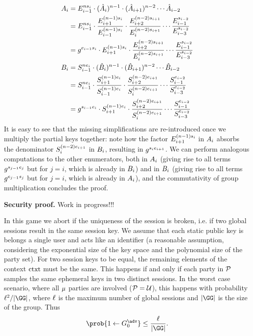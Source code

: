 \begin{align*}
	A_{i} &= E_{i-1}^{ns_i} \cdot (\hat{A}_{i})^{n-1} \cdot (\hat{A}_{i+1})^{n-2} \cdots \hat{A}_{i-2} \\
	&= E_{i-1}^{ns_i} \cdot  \dfrac{E_{i+1}^{(n-1)s_i}}{E_{i-1}^{(n-1)s_i}} \cdot \dfrac{E_{i+2}^{(n-2)s_{i+1}}}{E_{i}^{(n-2)s_{i+1}}} \cdots  \dfrac{E_{i-1}^{s_{i-2}}}{E_{i-3}^{s_{i-2}}}  \\
	&= g^{e_{i-1}s_i} \cdot E_{i+1}^{(n-1)s_i} \cdot \dfrac{E_{i+2}^{(n-2)s_{i+1}}}{E_{i}^{(n-2)s_{i+1}}} \cdots  \dfrac{E_{i-1}^{s_{i-2}}}{E_{i-3}^{s_{i-2}}}  \\
	B_{i} &= S_{i-1}^{ne_i} \cdot (\hat{B}_{i})^{n-1} \cdot (\hat{B}_{i+1})^{n-2} \cdots \hat{B}_{i-2}  \\
	&= S_{i-1}^{ne_i} \cdot  \dfrac{S_{i+1}^{(n-1)e_i}}{S_{i-1}^{(n-1)e_i}} \cdot \dfrac{S_{i+2}^{(n-2)e_{i+1}}}{S_{i}^{(n-2)e_{i+1}}} \cdots  \dfrac{S_{i-1}^{e_{i-2}}}{S_{i-3}^{e_{i-2}}}  \\
	&= g^{s_{i-1}e_i} \cdot S_{i+1}^{(n-1)e_i} \cdot \dfrac{S_{i+2}^{(n-2)e_{i+1}}}{S_{i}^{(n-2)e_{i+1}}} \cdots  \dfrac{S_{i-1}^{e_{i-2}}}{S_{i-3}^{e_{i-2}}}  \\
\end{align*}
It is easy to see that the missing simplifications are re-introduced once we multiply the partial keys together: note how the factor $E_{i+1}^{(n-1)s_i}$ in $A_{i}$ absorbs the denominator ${S_{i}^{(n-2)e_{i+1}}}$ in $B_{i}$, resulting in $g^{s_i e_{i+1}}$.
We can perform analogous computations to the other enumerators, both in $A_{i}$ (giving rise to all terms $g^{s_{j-1}e_j}$ but for $j=i$, which is already in $B_{i}$) and in $B_{i}$ (giving rise to all terms $g^{e_{j-1}s_j}$ but for $j=i$, which is already in $A_{i}$), and the commutativity of group multiplication concludes the proof.\medskip

\textbf{Security proof.}
{\color{red}Work in progress!!!}

In this game we abort if the uniqueness of the session is broken, i.e. if two global sessions result in the same session key. 
We assume that each static public key is belongs a single user and acts like an identifier (a reasonable assumption, considering the exponential size of the key space and the polynomial size of the party set). 
For two session keys to be equal, the remaining elements of the context $\text{ctxt}$ must be the same.
This happens if and only if each party in $\mathcal{P}$ samples the same ephemeral keys in two distinct sessions.
In the worst case scenario, where all $\mu$ parties are involved ($\mathcal{P} = \mathcal{U}$), this happens with probability $\maxsessions^2/|\GG|$, where $\ell$ is the maximum number of global sessions and $|\GG|$ is the size of the group.
Thus
\[ \prob{1 \gets G_0^\adv} \leq \dfrac{\maxsessions}{|\GG|}.\]